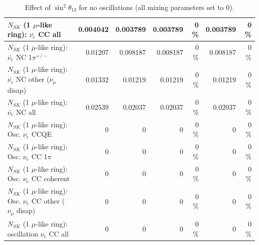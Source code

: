 \begin{table}
\begin{tabular}{| l | r | r | r  r | r  r |}
                            $N_{SK}$ (1 $\mu$-like ring): $\bar{\nu_{e}}$ CC all &        0.004042 &        0.003789 &        0.003789 &        0 \%  &        0.003789 &        0 \%  \\ 
\hline
                     $N_{SK}$ (1 $\mu$-like ring): $\bar{\nu_e}$ NC 1$\pi^{+/-}$ &         0.01207 &        0.008187 &        0.008187 &        0 \%  &        0.008187 &        0 \%  \\ 
          $N_{SK}$ (1 $\mu$-like ring): $\bar{\nu_e}$ NC other ($\nu_\mu$ disap) &         0.01332 &         0.01219 &         0.01219 &        0 \%  &         0.01219 &        0 \%  \\ 
                            $N_{SK}$ (1 $\mu$-like ring): $\bar{\nu_{e}}$ NC all &         0.02539 &         0.02037 &         0.02037 &        0 \%  &         0.02037 &        0 \%  \\ 
\hline
\hline
\hline
                                 $N_{SK}$ (1 $\mu$-like ring): Osc. $\nu_e$ CCQE &               0 &               0 &               0 &        0 \%  &               0 &        0 \%  \\ 
                            $N_{SK}$ (1 $\mu$-like ring): Osc. $\nu_e$ CC 1$\pi$ &               0 &               0 &               0 &        0 \%  &               0 &        0 \%  \\ 
                          $N_{SK}$ (1 $\mu$-like ring): Osc. $\nu_e$ CC coherent &               0 &               0 &               0 &        0 \%  &               0 &        0 \%  \\ 
           $N_{SK}$ (1 $\mu$-like ring): Osc. $\nu_e$ CC other ($\nu_\mu$ disap) &               0 &               0 &               0 &        0 \%  &               0 &        0 \%  \\ 
                        $N_{SK}$ (1 $\mu$-like ring): oscillation $\nu_e$ CC all &               0 &               0 &               0 &        0 \%  &               0 &        0 \%  \\ 
\hline
\hline
\end{tabular}
\caption{ Effect of $\sin^2\theta_{13}$ for no oscillations (all mixing parameters set to 0). }
\label{tab:num_mixing13_1RmuT_3f_osc_t13:0}
\end{table}
\clearpage
